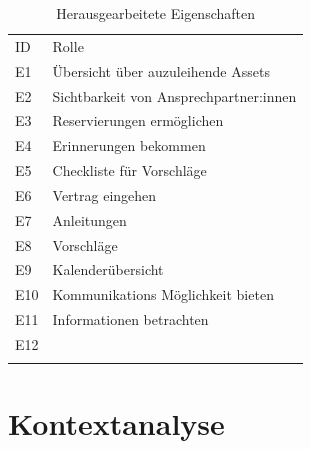 \begin{table}[h]
        \centering
        \caption{Herausgearbeitete Eigenschaften}
        \begin{tabular}{ll}
                \arrayrulecolor{maincolor}\hline
                \sffamily\color{maincolor}ID & \sffamily\color{maincolor}Rolle
                \\
                \arrayrulecolor{maincolor}\hline
                E1                           & Übersicht über auzuleihende
                Assets                                                           \\
                E2                           & Sichtbarkeit von
                Ansprechpartner:innen                                            \\
                E3                           & Reservierungen ermöglichen        \\
                E4                           & Erinnerungen bekommen             \\
                E5                           & Checkliste für Vorschläge         \\
                E6                           & Vertrag eingehen                  \\
                E7                           & Anleitungen                       \\
                E8                           & Vorschläge                        \\
                E9                           & Kalenderübersicht                 \\
                E10                          & Kommunikations Möglichkeit bieten
                \\
                E11                          & Informationen betrachten          \\
                E12                          &                                   \\
                \arrayrulecolor{maincolor}\hline
        \end{tabular}
        \label{table:e}
        \hfill
\end{table}




\section{Kontextanalyse}
\label{section:kontext}

